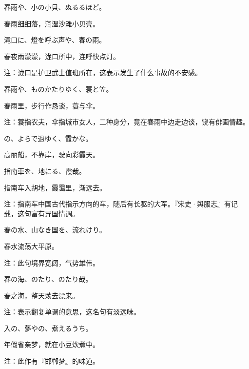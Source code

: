 \begin{haiku}
    {\FH 春雨や、小の小貝、ぬるるほど。}

    {\FK 春雨细细落，润湿沙滩小贝壳。}
\end{haiku}

\begin{haiku}
    {\FH 滝口に、燈を呼ぶ声や、春の雨。}

    {\FK 春夜雨濛濛，泷口所中，连呼快点灯。}

    {\FT 注：泷口是护卫武士值班所在，这表示发生了什么事故的不安感。}
\end{haiku}

\begin{haiku}
    {\FH 春雨や、ものかたりゆく、蓑と笠。}

    {\FK 春雨里，步行作恳谈，蓑与伞。}

    {\FT 注：蓑指农夫，伞指城市女人，二种身分，竟在春雨中边走边谈，饶有俳画情趣。}
\end{haiku}

\begin{haiku}
    {\FH {}の、よらで過ゆく、霞かな。}

    {\FK 高丽船，不靠岸，驶向彩霞天。}
\end{haiku}

\begin{haiku}
    {\FH 指南車を、地にる、霞哉。}

    {\FK 指南车入胡地，霞霭里，渐远去。}

    {\FT 注：指南车中国古代指示方向的车，随后有长驱的大军。『宋史·舆服志』有记载，这句富有异国情调。}
\end{haiku}

\begin{haiku}
    {\FH 春の水、山なき国を、流れけり。}

    {\FK 春水流荡大平原。}

    {\FT 注：此句境界宽阔，气势雄伟。}
\end{haiku}

\begin{haiku}
    {\FH 春の海、のたり、のたり哉。}

    {\FK 春之海，整天荡去漂来。}

    {\FT 注：表示翻复单调的意思，这名句有淡远味。}
\end{haiku}

\begin{haiku}
    {\FH {}入の、夢やの、煮えるうち。}

    {\FK 年假省亲梦，就在小豆炊煮中。}

    {\FT 注：此作有『邯郸梦』的味道。}
\end{haiku}

